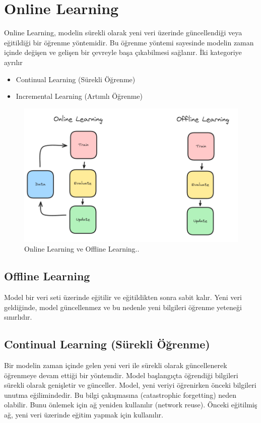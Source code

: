 \section{Online Learning}
Online Learning, modelin sürekli olarak yeni veri üzerinde güncellendiği veya eğitildiği bir öğrenme yöntemidir. Bu öğrenme yöntemi sayesinde modelin zaman içinde değişen ve gelişen bir çevreyle başa çıkabilmesi sağlanır. İki kategoriye ayrılır
\begin{itemize}
    \item Continual Learning (Sürekli Öğrenme)
    \item Incremental Learning (Artımlı Öğrenme)
\end{itemize}

\begin{figure}[h]
    \centering
    \includegraphics[width=1\textwidth]{images/online_vs_offline_learning.png}
    \caption{Online Learning ve Offline Learning..}
    \label{fig:enter-label}
\end{figure}

\subsection{Offline Learning}
Model bir veri seti üzerinde eğitilir ve eğitildikten sonra sabit kalır. Yeni veri geldiğinde, model güncellenmez ve bu nedenle yeni bilgileri öğrenme yeteneği sınırlıdır.

\subsection{Continual Learning (Sürekli Öğrenme)}
Bir modelin zaman içinde gelen yeni veri ile sürekli olarak güncellenerek öğrenmeye devam ettiği bir yöntemdir. Model başlangıçta öğrendiği bilgileri sürekli olarak genişletir ve günceller. Model, yeni veriyi öğrenirken önceki bilgileri unutma eğilimindedir. Bu bilgi çakışmasına (catastrophic forgetting) neden olabilir. Bunu önlemek için ağ yeniden kullanılır (network reuse). Önceki eğitilmiş ağ, yeni veri üzerinde eğitim yapmak için kullanılır.

